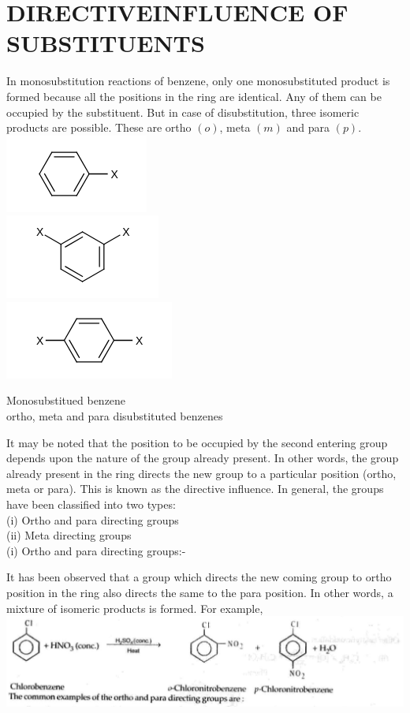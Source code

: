 \documentclass[10pt]{article}
\begin{document}
\section*{DIRECTIVEINFLUENCE OF SUBSTITUENTS}
In monosubstitution reactions of benzene, only one monosubstituted product is formed because all the positions in the ring are identical. Any of them can be occupied by the substituent. But in case of disubstitution, three isomeric products are possible. These are ortho $(o)$, meta $(m)$ and para $(p)$.\\
\includegraphics{smile-ebc102db93184437f7534f0f7aec80f4583d91df}\\
\includegraphics{smile-93e3a2caa2454901c6b47eb7052a352ecd6fce90}\\
\includegraphics{smile-f2b77f49e57793b96f91d18be989a1018c35f4a2}

Monosubstitued benzene\\
ortho, meta and para disubstituted benzenes

It may be noted that the position to be occupied by the second entering group depends upon the nature of the group already present. In other words, the group already present in the ring directs the new group to a particular position (ortho, meta or para). This is known as the directive influence. In general, the groups have been classified into two types:\\
(i) Ortho and para directing groups\\
(ii) Meta directing groups\\
(i) Ortho and para directing groups:-

It has been observed that a group which directs the new coming group to ortho position in the ring also directs the same to the para position. In other words, a mixture of isomeric products is formed. For example,\\
\includegraphics[max width=\textwidth, center]{2025_01_28_8470952b98110cec3aabg-212(1)}
\end{document}
